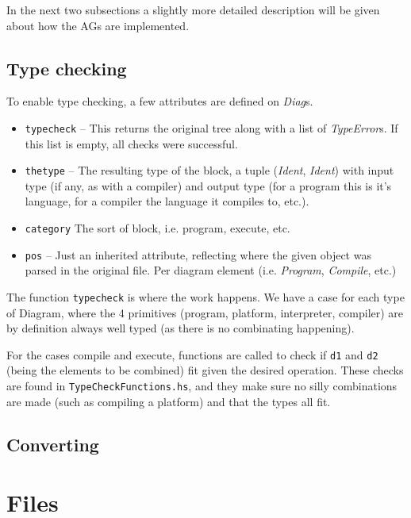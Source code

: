 \documentclass[a4paper]{article}
\begin{document}
In the next two subsections a slightly more detailed description will be given about how the AGs are implemented. 

\subsection{Type checking}

To enable type checking, a few attributes are defined on \emph{Diag}s. 

\begin{itemize}
    \item \texttt{typecheck} -- This returns the original tree along with a list of \emph{TypeError}s. If this list is empty, all checks were successful. 
    \item \texttt{thetype} -- The resulting type of the block, a tuple (\emph{Ident}, \emph{Ident}) with input type (if any, as with a compiler) and output type (for a program this is it's language, for a compiler the language it compiles to, etc.).
    \item \texttt{category} The sort of block, i.e. program, execute, etc. 
    \item \texttt{pos} -- Just an inherited attribute, reflecting where the given object was parsed in the original file. Per diagram element (i.e. \emph{Program}, \emph{Compile}, etc.)
\end{itemize}

The function \texttt{typecheck} is where the work happens. We have a case for each type of Diagram, where the 4 primitives (program, platform, interpreter, compiler) are by definition always well typed (as there is no combinating happening). 

For the cases compile and execute, functions are called to check if \texttt{d1} and \texttt{d2} (being the elements to be combined) fit given the desired operation. These checks are found in \texttt{TypeCheckFunctions.hs}, and they make sure no silly combinations are made (such as compiling a platform) and that the types all fit.  


\subsection{Converting}



\section{Files}
\end{document}
